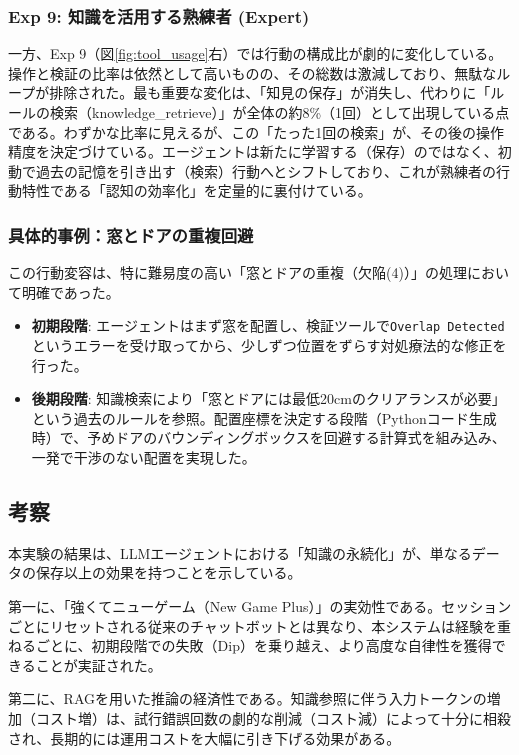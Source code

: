 \documentclass{deimj}
\begin{document}
\subsubsection{Exp 9: 知識を活用する熟練者 (Expert)}

一方、Exp 9（図\ref{fig:tool_usage}右）では行動の構成比が劇的に変化している。操作と検証の比率は依然として高いものの、その総数は激減しており、無駄なループが排除された。最も重要な変化は、「知見の保存」が消失し、代わりに「ルールの検索（knowledge\_retrieve）」が全体の約8\%（1回）として出現している点である。わずかな比率に見えるが、この「たった1回の検索」が、その後の操作精度を決定づけている。エージェントは新たに学習する（保存）のではなく、初動で過去の記憶を引き出す（検索）行動へとシフトしており、これが熟練者の行動特性である「認知の効率化」を定量的に裏付けている。

\subsubsection{具体的事例：窓とドアの重複回避}

この行動変容は、特に難易度の高い「窓とドアの重複（欠陥(4)）」の処理において明確であった。

\begin{itemize}
  \item \textbf{初期段階}: エージェントはまず窓を配置し、検証ツールで\texttt{Overlap Detected}というエラーを受け取ってから、少しずつ位置をずらす対処療法的な修正を行った。
  \item \textbf{後期段階}: 知識検索により「窓とドアには最低20cmのクリアランスが必要」という過去のルールを参照。配置座標を決定する段階（Pythonコード生成時）で、予めドアのバウンディングボックスを回避する計算式を組み込み、一発で干渉のない配置を実現した。
\end{itemize}

\subsection{考察}

本実験の結果は、LLMエージェントにおける「知識の永続化」が、単なるデータの保存以上の効果を持つことを示している。

第一に、「強くてニューゲーム（New Game Plus）」の実効性である。セッションごとにリセットされる従来のチャットボットとは異なり、本システムは経験を重ねるごとに、初期段階での失敗（Dip）を乗り越え、より高度な自律性を獲得できることが実証された。

第二に、RAGを用いた推論の経済性である。知識参照に伴う入力トークンの増加（コスト増）は、試行錯誤回数の劇的な削減（コスト減）によって十分に相殺され、長期的には運用コストを大幅に引き下げる効果がある。
\end{document}
